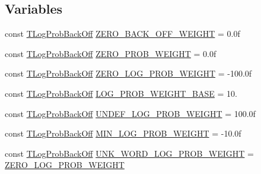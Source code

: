 \subsection*{Variables}
\begin{DoxyCompactItemize}
\item 
const \hyperlink{namespaceuva_1_1smt_1_1tries_acd0660255dd9ef5d644f01de49102750}{T\+Log\+Prob\+Back\+Off} \hyperlink{namespaceuva_1_1smt_1_1tries_a6349e9615ac860d59344a18d7261a55e}{Z\+E\+R\+O\+\_\+\+B\+A\+C\+K\+\_\+\+O\+F\+F\+\_\+\+W\+E\+I\+G\+H\+T} = 0.\+0f
\item 
const \hyperlink{namespaceuva_1_1smt_1_1tries_acd0660255dd9ef5d644f01de49102750}{T\+Log\+Prob\+Back\+Off} \hyperlink{namespaceuva_1_1smt_1_1tries_ab01df7aece204ae7147b6bdaa36b0aec}{Z\+E\+R\+O\+\_\+\+P\+R\+O\+B\+\_\+\+W\+E\+I\+G\+H\+T} = 0.\+0f
\item 
const \hyperlink{namespaceuva_1_1smt_1_1tries_acd0660255dd9ef5d644f01de49102750}{T\+Log\+Prob\+Back\+Off} \hyperlink{namespaceuva_1_1smt_1_1tries_a60f325085f4d50c378efc2809a6fecc0}{Z\+E\+R\+O\+\_\+\+L\+O\+G\+\_\+\+P\+R\+O\+B\+\_\+\+W\+E\+I\+G\+H\+T} = -\/100.\+0f
\item 
const \hyperlink{namespaceuva_1_1smt_1_1tries_acd0660255dd9ef5d644f01de49102750}{T\+Log\+Prob\+Back\+Off} \hyperlink{namespaceuva_1_1smt_1_1tries_ac729c4f31fd2bab9e8af8f6370344b87}{L\+O\+G\+\_\+\+P\+R\+O\+B\+\_\+\+W\+E\+I\+G\+H\+T\+\_\+\+B\+A\+S\+E} = 10.
\item 
const \hyperlink{namespaceuva_1_1smt_1_1tries_acd0660255dd9ef5d644f01de49102750}{T\+Log\+Prob\+Back\+Off} \hyperlink{namespaceuva_1_1smt_1_1tries_aca016fa589cf7fafbb1a9928d7c96a05}{U\+N\+D\+E\+F\+\_\+\+L\+O\+G\+\_\+\+P\+R\+O\+B\+\_\+\+W\+E\+I\+G\+H\+T} = 100.\+0f
\item 
const \hyperlink{namespaceuva_1_1smt_1_1tries_acd0660255dd9ef5d644f01de49102750}{T\+Log\+Prob\+Back\+Off} \hyperlink{namespaceuva_1_1smt_1_1tries_ad5bdb438c092690f6558e60026681d84}{M\+I\+N\+\_\+\+L\+O\+G\+\_\+\+P\+R\+O\+B\+\_\+\+W\+E\+I\+G\+H\+T} = -\/10.\+0f
\item 
const \hyperlink{namespaceuva_1_1smt_1_1tries_acd0660255dd9ef5d644f01de49102750}{T\+Log\+Prob\+Back\+Off} \hyperlink{namespaceuva_1_1smt_1_1tries_aa37a810d0575a78f203dacc380a69d1d}{U\+N\+K\+\_\+\+W\+O\+R\+D\+\_\+\+L\+O\+G\+\_\+\+P\+R\+O\+B\+\_\+\+W\+E\+I\+G\+H\+T} = \hyperlink{namespaceuva_1_1smt_1_1tries_a60f325085f4d50c378efc2809a6fecc0}{Z\+E\+R\+O\+\_\+\+L\+O\+G\+\_\+\+P\+R\+O\+B\+\_\+\+W\+E\+I\+G\+H\+T}
\end{DoxyCompactItemize}


